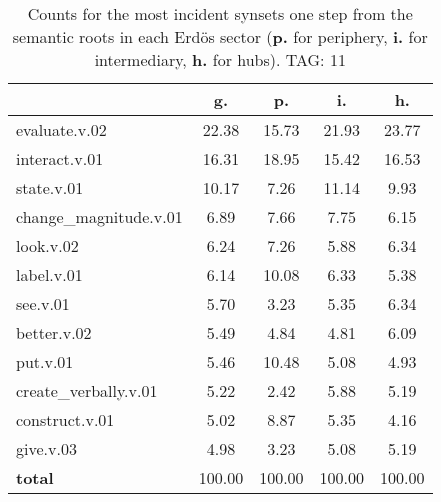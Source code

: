 \begin{table}[h!]
\begin{center}
\begin{tabular}{| l | c | c | c | c |}\hline
 & g. & p. & i. & h. \\\hline
evaluate.v.02 & 22.38  & 15.73  & 21.93  & 23.77 \\\hline
interact.v.01 & 16.31  & 18.95  & 15.42  & 16.53 \\\hline
state.v.01 & 10.17  & 7.26  & 11.14  & 9.93 \\\hline
change\_magnitude.v.01 & 6.89  & 7.66  & 7.75  & 6.15 \\\hline
look.v.02 & 6.24  & 7.26  & 5.88  & 6.34 \\\hline
label.v.01 & 6.14  & 10.08  & 6.33  & 5.38 \\\hline
see.v.01 & 5.70  & 3.23  & 5.35  & 6.34 \\\hline
better.v.02 & 5.49  & 4.84  & 4.81  & 6.09 \\\hline
put.v.01 & 5.46  & 10.48  & 5.08  & 4.93 \\\hline
create\_verbally.v.01 & 5.22  & 2.42  & 5.88  & 5.19 \\\hline
construct.v.01 & 5.02  & 8.87  & 5.35  & 4.16 \\\hline
give.v.03 & 4.98  & 3.23  & 5.08  & 5.19 \\\hline
{{\bf total}} & 100.00  & 100.00  & 100.00  & 100.00 \\\hline
\end{tabular}
\caption{Counts for the most incident synsets one step from the semantic roots in each Erd\"os sector ({\bf p.} for periphery, {\bf i.} for intermediary, {\bf h.} for hubs). TAG: 11}
\end{center}
\end{table}